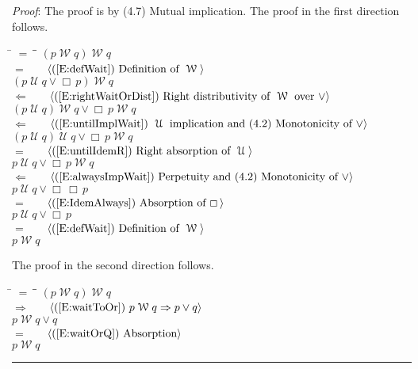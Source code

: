 \documentclass[12pt, fleqn, leqno]{article}
\newcommand{\lgap}{2pt}                             %
\newcommand{\mymathindent}{24pt}                    %
\newcommand{\impl}{\ensuremath{\Rightarrow}}        %
\newcommand{\foll}{\ensuremath{\Leftarrow}}         %
\newcommand{\Until}{\;\mathcal{U}\;}
\newcommand{\Wait}{\;\mathcal{W}\;}
\newcommand{\Always}{\Box\,}
\newcommand{\myqed}{\rule[-.23ex]{1.2ex}{2.0ex}}
\newcommand{\myqedtab}{\hspace{384pt}}              %
\newcommand{\Gll} {\langle}                         %
\newcommand{\Ggg} {\rangle}                         %
\newcommand{\Hint}[1]     {\ \ \ $\Gll              \mbox{#1} \Ggg$ }   %
\begin{document}
\emph{Proof}: The proof is by (4.7) Mutual implication.
The proof in the first direction follows.
\begin{tabbing}
\hspace{\mymathindent} \= $= \;$ \= \myqedtab \= \kill
  \> \>   $(p \Wait q)\Wait q$\\[\lgap]
  \> $=$  \>  \Hint{(\ref{E:defWait}) Definition of $\Wait$}\\[\lgap]
  \> \>   $(p \Until q\lor \Always p)\Wait q$\\[\lgap]
  \> $\foll$  \>  \Hint{(\ref{E:rightWaitOrDist}) Right distributivity of $\Wait$ over $\lor$}\\[\lgap]
  \> \>   $(p \Until q)\Wait q \lor \Always p\Wait q$\\[\lgap]
  \> $\foll$  \>  \Hint{(\ref{E:untilImplWait}) $\Until$ implication and (4.2) Monotonicity of $\lor$}\\[\lgap]
  \> \>   $(p \Until q)\Until q \lor \Always p\Wait q$\\[\lgap]
  \> $=$  \>  \Hint{(\ref{E:untilIdemR}) Right absorption of $\Until$}\\[\lgap]
  \> \>   $p \Until q \lor \Always p\Wait q$\\[\lgap]
  \> $\foll$  \>  \Hint{(\ref{E:alwaysImpWait}) Perpetuity and (4.2) Monotonicity of $\lor$}\\[\lgap]
  \> \>   $p \Until q \lor \Always \Always p$\\[\lgap]
  \> $=$  \>  \Hint{(\ref{E:IdemAlways}) Absorption of $\Always$}\\[\lgap]
  \> \>   $p \Until q \lor \Always p$\\[\lgap]
  \> $=$  \>  \Hint{(\ref{E:defWait}) Definition of $\Wait$}\\[\lgap]
  \> \>   $p \Wait q$
\end{tabbing}
The proof in the second direction follows.
\begin{tabbing}
\hspace{\mymathindent} \= $= \;$ \= \myqedtab \= \kill
  \> \>   $(p \Wait q) \Wait q$\\[\lgap]
  \> $\impl$  \>  \Hint{(\ref{E:waitToOr}) $p \Wait q \impl p \lor q$}\\[\lgap]
  \> \>   $p \Wait q \lor q$\\[\lgap]
  \> $=$  \>  \Hint{(\ref{E:waitOrQ}) Absorption}\\[\lgap]
  \> \>   $p \Wait q$ \quad \myqed
\end{tabbing}
\end{document}
